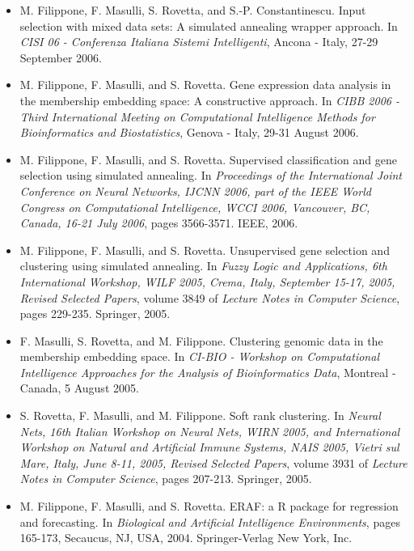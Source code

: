 \begin{itemize}
\item  M. Filippone, F. Masulli, S. Rovetta, and S.-P. Constantinescu. Input selection with mixed data sets: A simulated annealing wrapper approach. In \emph{CISI 06 - Conferenza Italiana Sistemi Intelligenti}, Ancona - Italy, 27-29 September 2006. 
\item  M. Filippone, F. Masulli, and S. Rovetta. Gene expression data analysis in the membership embedding space: A constructive approach. In \emph{CIBB 2006 - Third International Meeting on Computational Intelligence Methods for Bioinformatics and Biostatistics}, Genova - Italy, 29-31 August 2006. 
\item  M. Filippone, F. Masulli, and S. Rovetta. Supervised classification and gene selection using simulated annealing. In \emph{Proceedings of the International Joint Conference on Neural Networks, IJCNN 2006, part of the IEEE World Congress on Computational Intelligence, WCCI 2006, Vancouver, BC, Canada, 16-21 July 2006}, pages 3566-3571. IEEE, 2006.  
\item  M. Filippone, F. Masulli, and S. Rovetta. Unsupervised gene selection and clustering using simulated annealing. In \emph{Fuzzy Logic and Applications, 6th International Workshop, WILF 2005, Crema, Italy, September 15-17, 2005, Revised Selected Papers}, volume 3849 of \emph{Lecture Notes in Computer Science}, pages 229-235. Springer, 2005.  
\item  F. Masulli, S. Rovetta, and M. Filippone. Clustering genomic data in the membership embedding space. In \emph{CI-BIO - Workshop on Computational Intelligence Approaches for the Analysis of Bioinformatics Data}, Montreal - Canada, 5 August 2005. 
\item  S. Rovetta, F. Masulli, and M. Filippone. Soft rank clustering. In \emph{Neural Nets, 16th Italian Workshop on Neural Nets, WIRN 2005, and International Workshop on Natural and Artificial Immune Systems, NAIS 2005, Vietri sul Mare, Italy, June 8-11, 2005, Revised Selected Papers}, volume 3931 of \emph{Lecture Notes in Computer Science}, pages 207-213. Springer, 2005.  
\item  M. Filippone, F. Masulli, and S. Rovetta. ERAF: a R package for regression and forecasting. In \emph{Biological and Artificial Intelligence Environments}, pages 165-173, Secaucus, NJ, USA, 2004. Springer-Verlag New York, Inc. 


\end{itemize}
